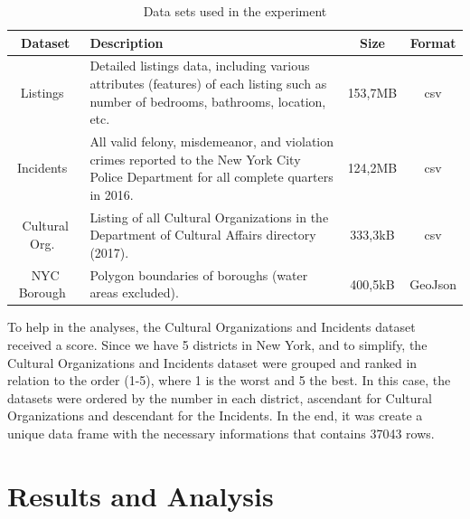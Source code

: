 \documentclass[sigconf]{acmart}
\begin{document}
\begin{table}[!htpb]
	\fontsize{7pt}{7pt}\selectfont
	\centering
	\caption{Data sets used in the experiment}
	\label{tab:datasets}
	\begin{tabular}{cp{3.5cm}cc}
		\toprule
		         \textbf{Dataset}          & \textbf{Description}                                                                                                                   & \textbf{Size} & \textbf{Format} \\ \midrule
		   Listings~\cite{base:airbnb}     & Detailed listings data, including various attributes (features) of each listing such as number of bedrooms, bathrooms, location, etc.  &    153,7MB    &       csv       \\ \midrule
		 Incidents~\cite{base:incidents}   & All valid felony, misdemeanor, and violation crimes reported to the New York City Police Department for all complete quarters in 2016. &    124,2MB    &       csv       \\ \midrule
		Cultural Org.~\cite{base:cultural} & Listing of all Cultural Organizations in the Department of Cultural Affairs directory (2017).                                                 &    333,3kB    &       csv       \\ \midrule
		 NYC Borough~\cite{base:borough}   & Polygon boundaries of boroughs (water areas excluded).                                                                                 &    400,5kB    &     GeoJson     \\ \bottomrule
	\end{tabular}
\end{table}

%
To help in the analyses, the Cultural Organizations and Incidents dataset received a score. Since we have 5 districts in New York, and to simplify, the Cultural Organizations and Incidents dataset were grouped and ranked in relation to the order (1-5), where 1 is the worst and 5 the best. In this case, the datasets were ordered by the number in each district, ascendant for Cultural Organizations and descendant for the Incidents. In the end, it was create a unique data frame with the necessary informations that contains 37043 rows. 

\section{Results and Analysis}
\label{sec:results}
\end{document}
